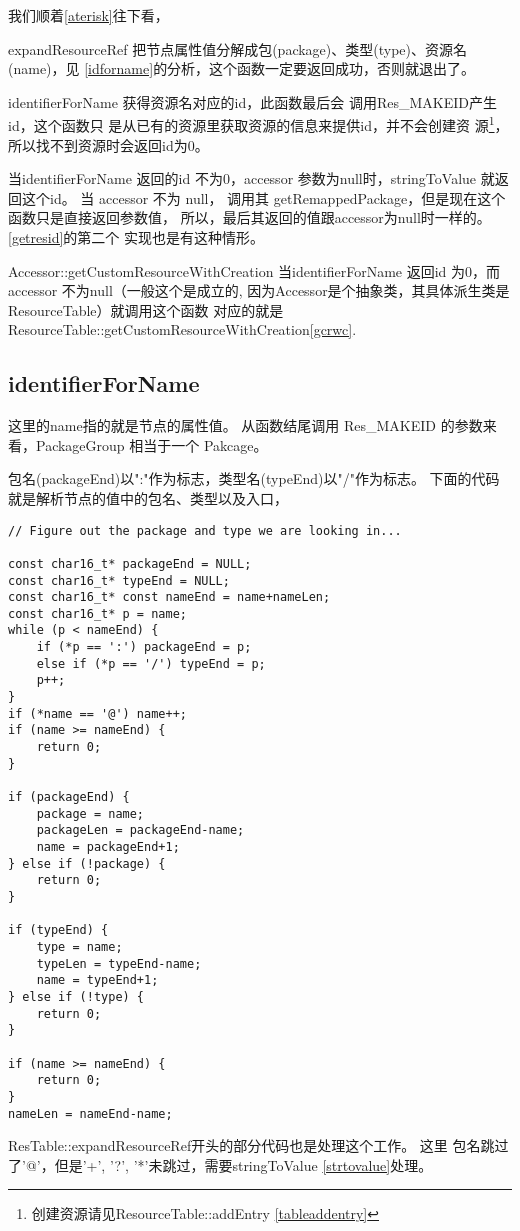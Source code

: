 \documentclass[a4paper,11pt]{article}
\begin{document}
我们顺着\autoref{aterisk}往下看\label{derefer}，
\begin{itemize*}
\item expandResourceRef 把节点属性值分解成包(package)、类型(type)、资源名(name)，见
        \autoref{idforname}的分析，这个函数一定要返回成功，否则就退出了。
\item identifierForName 获得资源名对应的id，此函数最后会
    调用Res_MAKEID产生id，这个函数只
    是从已有的资源里获取资源的信息来提供id，并不会创建资
    源\footnote{创建资源请见ResourceTable::addEntry
    \cref{tableaddentry}}，所以找不到资源时会返回id为0。

    当identifierForName 返回的id 不为0，accessor 参数为null时，stringToValue
    就返回这个id。 当 accessor 不为 null， 调用其
    getRemappedPackage，但是现在这个函数只是直接返回参数值，
    所以，最后其返回的值跟accessor为null时一样的。\autoref{getresid}的第二个
    实现也是有这种情形。

\item Accessor::getCustomResourceWithCreation 当identifierForName 返回id
为0，而accessor 不为null（一般这个是成立的,
因为Accessor是个抽象类，其具体派生类是ResourceTable）就调用这个函数
对应的就是ResourceTable::getCustomResourceWithCreation\cref{gcrwc}.

\end{itemize*}

\subsection{identifierForName}\label{idforname}
这里的name指的就是节点的属性值。
从函数结尾调用 Res_MAKEID 的参数来看，PackageGroup 相当于一个 Pakcage。

包名(packageEnd)以":"作为标志，类型名(typeEnd)以"/"作为标志。
下面的代码就是解析节点的值中的包名、类型以及入口，
\begin{lstlisting}[multicols=2,caption=identifierForName解析节点的代码]
// Figure out the package and type we are looking in...

const char16_t* packageEnd = NULL;
const char16_t* typeEnd = NULL;
const char16_t* const nameEnd = name+nameLen;
const char16_t* p = name;
while (p < nameEnd) {
    if (*p == ':') packageEnd = p;
    else if (*p == '/') typeEnd = p;
    p++;
}
if (*name == '@') name++;
if (name >= nameEnd) {
    return 0;
}

if (packageEnd) {
    package = name;
    packageLen = packageEnd-name;
    name = packageEnd+1;
} else if (!package) {
    return 0;
}

if (typeEnd) {
    type = name;
    typeLen = typeEnd-name;
    name = typeEnd+1;
} else if (!type) {
    return 0;
}

if (name >= nameEnd) {
    return 0;
}
nameLen = nameEnd-name;
\end{lstlisting}
ResTable::expandResourceRef开头的部分代码也是处理这个工作。
这里 包名跳过了'@'，但是'+', '?', '*'未跳过，需要stringToValue
\cref{strtovalue}处理。
\end{document}
